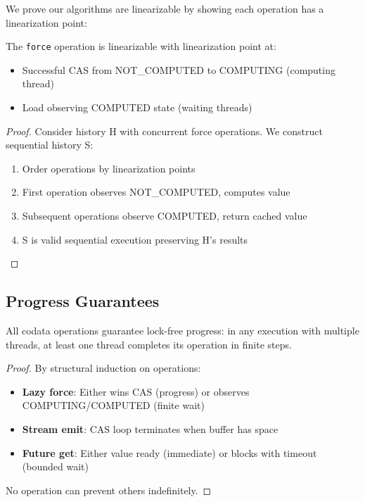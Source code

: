 \documentclass[sigconf,review,anonymous]{acmart}
\begin{document}
We prove our algorithms are linearizable by showing each operation has a linearization point:

\begin{theorem}
The \texttt{force} operation is linearizable with linearization point at:
\begin{itemize}
\item Successful CAS from NOT\_COMPUTED to COMPUTING (computing thread)
\item Load observing COMPUTED state (waiting threads)
\end{itemize}
\end{theorem}

\begin{proof}
Consider history H with concurrent force operations. We construct sequential history S:
\begin{enumerate}
\item Order operations by linearization points
\item First operation observes NOT\_COMPUTED, computes value
\item Subsequent operations observe COMPUTED, return cached value
\item S is valid sequential execution preserving H's results
\end{enumerate}
\end{proof}

\subsection{Progress Guarantees}

\begin{theorem}
All codata operations guarantee lock-free progress: in any execution with multiple threads, at least one thread completes its operation in finite steps.
\end{theorem}

\begin{proof}
By structural induction on operations:
\begin{itemize}
\item \textbf{Lazy force}: Either wins CAS (progress) or observes COMPUTING/COMPUTED (finite wait)
\item \textbf{Stream emit}: CAS loop terminates when buffer has space
\item \textbf{Future get}: Either value ready (immediate) or blocks with timeout (bounded wait)
\end{itemize}
No operation can prevent others indefinitely.
\end{proof}
\end{document}
